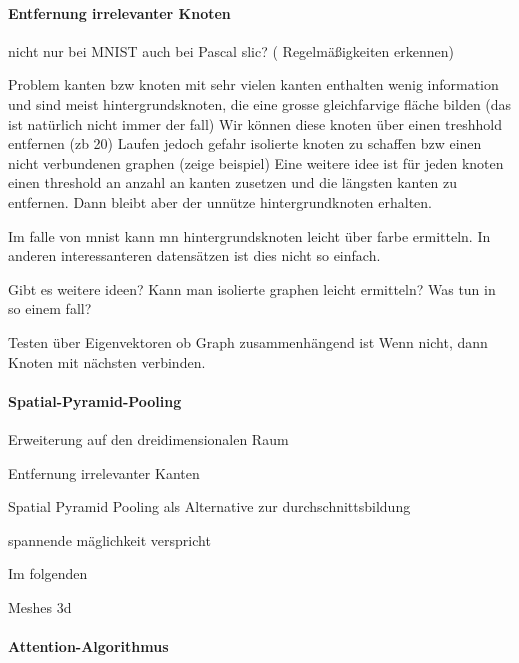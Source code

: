 \paragraph{Entfernung irrelevanter Knoten}
\label{entfernung_irrelevanter_knoten}

nicht nur bei \gls{MNIST}
auch bei \gls{Pascal} slic? (\zB{} Regelmäßigkeiten erkennen)

Problem kanten bzw knoten mit sehr vielen kanten enthalten wenig information und sind meist hintergrundsknoten, die eine grosse gleichfarvige fläche bilden (das ist natürlich nicht immer der fall)
Wir können diese knoten über einen treshhold entfernen (zb 20)
Laufen jedoch gefahr isolierte knoten zu schaffen bzw einen nicht verbundenen graphen (zeige beispiel)
 Eine weitere idee ist für jeden knoten einen threshold an anzahl an kanten zusetzen und die längsten kanten zu entfernen. Dann bleibt aber der unnütze hintergrundknoten erhalten.

Im falle von mnist kann mn hintergrundsknoten leicht über farbe ermitteln.
In anderen interessanteren datensätzen ist dies nicht so einfach.

Gibt es weitere ideen?
Kann man isolierte graphen leicht ermitteln? Was tun in so einem fall?

Testen über Eigenvektoren ob Graph zusammenhängend ist
Wenn nicht, dann Knoten mit nächsten verbinden.

\paragraph{Spatial-Pyramid-Pooling}
\label{spatial_pyramid_pooling}

Erweiterung auf den dreidimensionalen Raum

Entfernung irrelevanter Kanten

Spatial Pyramid Pooling als Alternative zur durchschnittsbildung


spannende mäglichkeit verspricht

Im folgenden

Meshes 3d





\paragraph{Attention-Algorithmus}
\label{attention_algorithmus}

